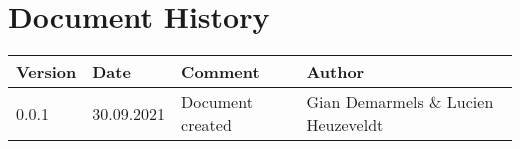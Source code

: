 \chapter*{Document History}

\begin{tabular}{ ||l|l|l|l|| } 
 \hline
 Version & Date & Comment & Author \\
 \hline\hline
 0.0.1 & 30.09.2021 & Document created & Gian Demarmels \& Lucien Heuzeveldt \\
 \hline
\end{tabular}

